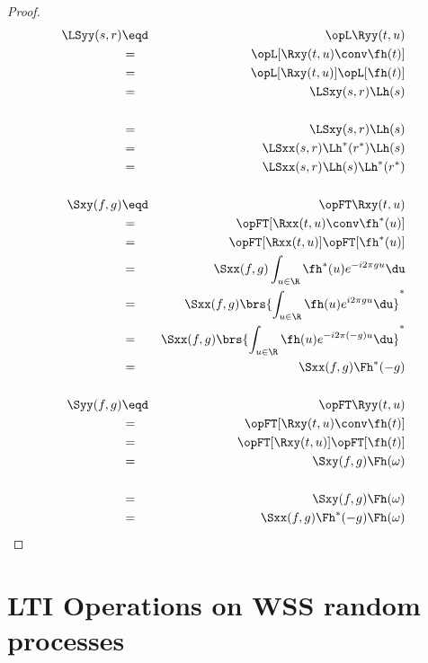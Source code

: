 \begin{proof}
\begin{eqnarray*}
   \LSyy(s,r)
     &\eqd& \opL\Ryy(t,u)
   \\&=&    \opL[\Rxy(t,u) \conv \fh(t)]
   \\&=&    \opL[\Rxy(t,u)]\opL[\fh(t)]
   \\&=&    \LSxy(s,r) \Lh(s)
\\
   \\&=&    \LSxy(s,r) \Lh(s)
   \\&=&    \LSxx(s,r) \Lh^\ast(r^\ast)\Lh(s)
   \\&=&    \LSxx(s,r) \Lh(s) \Lh^\ast(r^\ast)
\\ \\
   \Sxy(f,g)
     &\eqd& \opFT\Rxy(t,u)
   \\&=&    \opFT[\Rxx(t,u) \conv \fh^\ast(u)]
   \\&=&    \opFT[\Rxx(t,u)]\opFT[\fh^\ast(u)]
   \\&=&    \Sxx(f,g) \int_{u\in\R}\fh^\ast(u) e^{-i2\pi g u} \du
   \\&=&    \Sxx(f,g) \brs{\int_{u\in\R}\fh(u) e^{i2\pi g u} \du }^\ast
   \\&=&    \Sxx(f,g) \brs{\int_{u\in\R}\fh(u) e^{-i2\pi(-g)u} \du }^\ast
   \\&=&    \Sxx(f,g) \Fh^\ast(-g)
\\ \\
   \Syy(f,g)
     &\eqd& \opFT\Ryy(t,u)
   \\&=&    \opFT[\Rxy(t,u) \conv \fh(t)]
   \\&=&    \opFT[\Rxy(t,u)]\opFT[\fh(t)]
   \\&=&    \Sxy(f,g) \Fh(\omega)
\\
   \\&=&    \Sxy(f,g) \Fh(\omega)
   \\&=&    \Sxx(f,g) \Fh^\ast(-g) \Fh(\omega)
\end{eqnarray*}
\end{proof}


\section{LTI Operations on WSS random processes}
\begin{definition}
\label{def:wss}
\end{definition}

